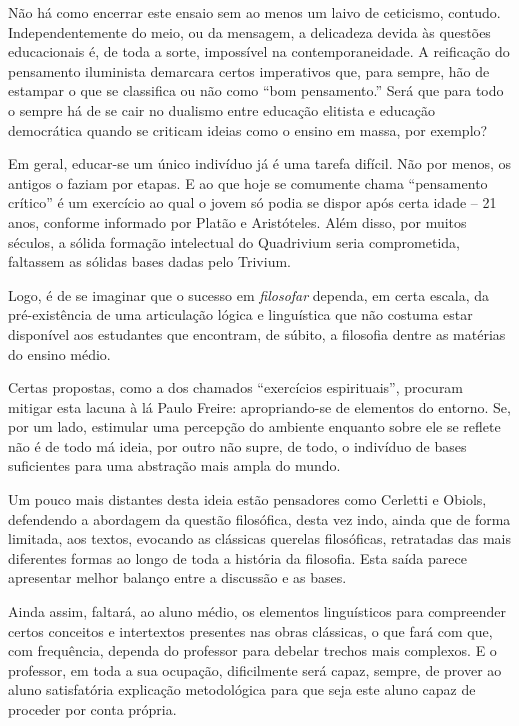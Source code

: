 \documentclass[12pt,a4paper]{article}
\begin{document}
	Não há como encerrar este ensaio sem ao menos um laivo de ceticismo, 
	contudo. Independentemente do meio, ou da mensagem, a delicadeza 
	devida às questões educacionais é, de toda a sorte, impossível na 
	contemporaneidade. A reificação do pensamento iluminista demarcara 
	certos imperativos que, para sempre, hão de estampar o que se 
	classifica ou não como “bom pensamento.” Será que para todo o sempre 
	há de se cair no dualismo entre educação elitista e educação 
	democrática quando se criticam ideias como o ensino em massa, 
	por exemplo? 

	Em geral, educar-se um único indivíduo já é uma tarefa difícil. 
	Não por menos, os antigos o faziam por etapas. E ao que hoje se 
	comumente chama “pensamento crítico” é um exercício ao qual o 
	jovem só podia se dispor após certa idade -- 21 anos, conforme 
	informado por Platão e Aristóteles. Além disso, por muitos 
	séculos, a sólida formação intelectual do Quadrivium seria 
	comprometida, faltassem as sólidas bases dadas pelo Trivium. 

	Logo, é de se imaginar que o sucesso em \textit{filosofar} 
	dependa, em certa escala, da pré-existência de uma articulação 
	lógica e linguística que não costuma estar disponível aos 
	estudantes que encontram, de súbito, a filosofia dentre as 
	matérias do ensino médio. 

	Certas propostas, como a dos chamados “exercícios espirituais”, 
	procuram mitigar esta lacuna à lá Paulo Freire: apropriando-se 
	de elementos do entorno. Se, por um lado, estimular uma percepção 
	do ambiente enquanto sobre ele se reflete não é de todo má ideia, 
	por outro não supre, de todo, o indivíduo de bases suficientes 
	para uma abstração mais ampla do mundo. 

	Um pouco mais distantes desta ideia estão pensadores como Cerletti e 
	Obiols, defendendo a abordagem da questão filosófica, desta vez 
	indo, ainda que de forma limitada, aos textos, evocando as clássicas 
	querelas filosóficas, retratadas das mais diferentes formas ao longo 
	de toda a história da filosofia. Esta saída parece apresentar 
	melhor balanço entre a discussão e as bases. 

	Ainda assim, faltará, 
	ao aluno médio, os elementos linguísticos para compreender certos 
	conceitos e intertextos presentes nas obras clássicas, o que fará 
	com que, com frequência, dependa do professor para debelar trechos 
	mais complexos. E o professor, em toda a sua ocupação, dificilmente 
	será capaz, sempre, de prover ao aluno satisfatória explicação 
	metodológica para que seja este aluno capaz de proceder por 
	conta própria. 
\end{document}
